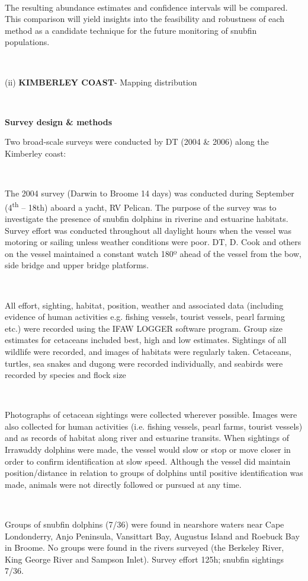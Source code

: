 \documentclass[version=last,
    paper=a4,                               %
    10pt,                                   %
    dvipsnames,
    oneside,                              %
    headings=openany,                       %
    open=any,
    BCOR=7mm,                               %
    DIV=15,     %
]{scrbook}
\begin{document}
~

The resulting abundance estimates and confidence intervals will be
compared. This comparison will yield insights into the feasibility and
robustness of each method as a candidate technique for the future
monitoring of snubfin populations.

~

(ii) \textbf{KIMBERLEY COAST}- Mapping distribution

\textbf{~}

\textbf{Survey design \& methods}

Two broad-scale surveys were conducted by DT (2004 \& 2006) along the
Kimberley coast:

~

The 2004 survey (Darwin to Broome 14 days) was conducted during
September (4\textsuperscript{th} -- 18th) aboard a yacht, RV Pelican.
The purpose of the survey was to investigate the presence of snubfin
dolphins in riverine and estuarine habitats. Survey effort was conducted
throughout all daylight hours when the vessel was motoring or sailing
unless weather conditions were poor. DT, D. Cook and others on the
vessel maintained a constant watch 180º ahead of the vessel from the
bow, side bridge and upper bridge platforms.

~

All effort, sighting, habitat, position, weather and associated data
(including evidence of human activities e.g. fishing vessels, tourist
vessels, pearl farming etc.) were recorded using the IFAW LOGGER
software program. Group size estimates for cetaceans included best, high
and low estimates. Sightings of all wildlife were recorded, and images
of habitats were regularly taken. Cetaceans, turtles, sea snakes and
dugong were recorded individually, and seabirds were recorded by species
and flock size

~

Photographs of cetacean sightings were collected wherever possible.
Images were also collected for human activities (i.e. fishing vessels,
pearl farms, tourist vessels) and as records of habitat along river and
estuarine transits. When sightings of Irrawaddy dolphins were made, the
vessel would slow or stop or move closer in order to confirm
identification at slow speed. Although the vessel did maintain
position/distance in relation to groups of dolphins until positive
identification was made, animals were not directly followed or pursued
at any time.

~

Groups of snubfin dolphins (7/36) were found in nearshore waters near
Cape Londonderry, Anjo Peninsula, Vansittart Bay, Augustus Island and
Roebuck Bay in Broome. No groups were found in the rivers surveyed (the
Berkeley River, King George River and Sampson Inlet). Survey effort
125h; snubfin sightings 7/36.
\end{document}
